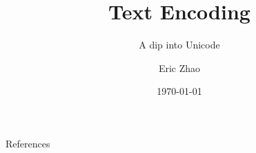 \documentclass[xcolor={dvipsnames},xtable]{beamer}
\title{Text Encoding}
\subtitle{A dip into Unicode}
\date{\today}
\author{Eric Zhao}
\begin{document}

\newcommand{\sectiontitle}{}
\newcommand{\currenttitle}{}

\maketitle

\newcommand{\subdir}{sections}





\renewcommand{\sectiontitle}{References}
\begin{frame}[allowframebreaks]{\sectiontitle}
  \printbibliography[heading=none]
\end{frame}
\end{document}
